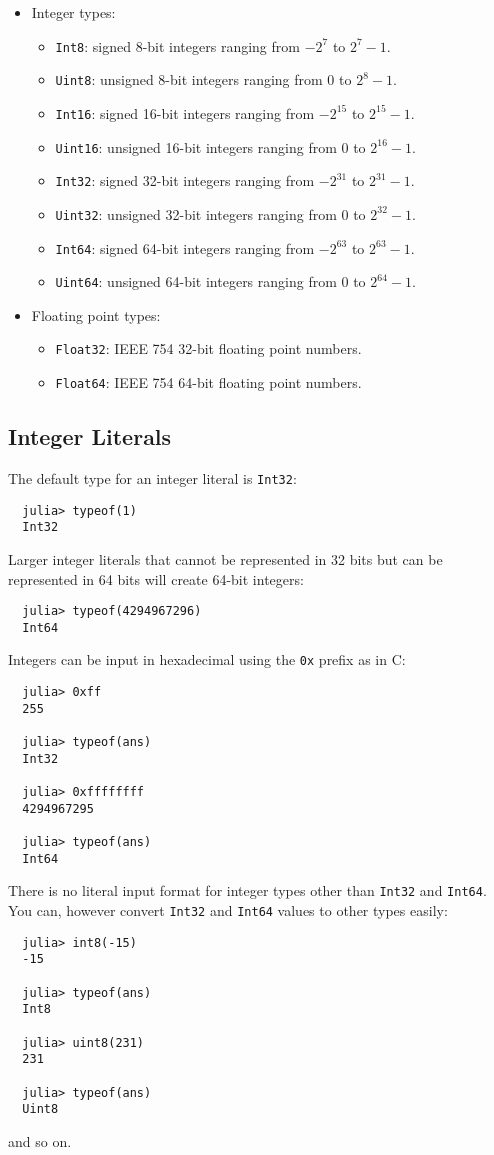 \documentclass{article}
\begin{document}
\begin{itemize}
  \item Integer types:
  \begin{itemize}
    \item \verb|Int8|: signed 8-bit integers ranging from $-2^7$ to $2^7-1$.
    \item \verb|Uint8|: unsigned 8-bit integers ranging from 0 to $2^8-1$.
    \item \verb|Int16|: signed 16-bit integers ranging from $-2^{15}$ to $2^{15}-1$.
    \item \verb|Uint16|: unsigned 16-bit integers ranging from 0 to $2^{16}-1$.
    \item \verb|Int32|: signed 32-bit integers ranging from $-2^{31}$ to $2^{31}-1$.
    \item \verb|Uint32|: unsigned 32-bit integers ranging from 0 to $2^{32}-1$.
    \item \verb|Int64|: signed 64-bit integers ranging from $-2^{63}$ to $2^{63}-1$.
    \item \verb|Uint64|: unsigned 64-bit integers ranging from 0 to $2^{64}-1$.
  \end{itemize}
  \item Floating point types:
  \begin{itemize}
    \item \verb|Float32|: IEEE 754 32-bit floating point numbers.
    \item \verb|Float64|: IEEE 754 64-bit floating point numbers.
  \end{itemize}
\end{itemize}

\subsection{Integer Literals}

The default type for an integer literal is \verb|Int32|:
\begin{verbatim}
  julia> typeof(1)
  Int32
\end{verbatim}
Larger integer literals that cannot be represented in 32 bits but can be represented in 64 bits will create 64-bit integers:
\begin{verbatim}
  julia> typeof(4294967296)
  Int64
\end{verbatim}
Integers can be input in hexadecimal using the \verb|0x| prefix as in C:
\begin{verbatim}
  julia> 0xff
  255

  julia> typeof(ans)
  Int32

  julia> 0xffffffff
  4294967295

  julia> typeof(ans)
  Int64
\end{verbatim}
There is no literal input format for integer types other than \verb|Int32| and \verb|Int64|. You can, however convert \verb|Int32| and \verb|Int64| values to other types easily:
\begin{verbatim}
  julia> int8(-15)
  -15

  julia> typeof(ans)
  Int8

  julia> uint8(231)
  231

  julia> typeof(ans)
  Uint8
\end{verbatim}
and so on.
\end{document}
